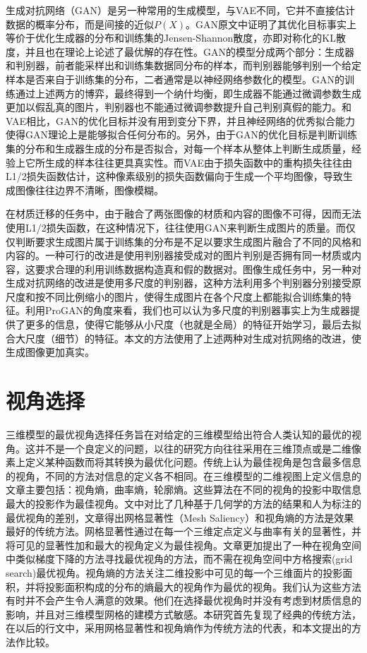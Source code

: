 \documentclass[UTF8,openany,AutoFakeBold,AutoFakeSlant,cs4size]{ctexbook}
\begin{document}
生成对抗网络（GAN）\cite{NIPS2014_5423}是另一种常用的生成模型，与VAE不同，它并不直接估计数据的概率分布，而是间接的近似$P(X)$。GAN原文中证明了其优化目标事实上等价于优化生成器的分布和训练集的Jensen-Shannon散度，亦即对称化的KL散度，并且也在理论上论述了最优解的存在性。GAN的模型分成两个部分：生成器和判别器，前者能采样出和训练集数据同分布的样本，而判别器能够判别一个给定样本是否来自于训练集的分布，二者通常是以神经网络参数化的模型。GAN的训练通过上述两方的博弈，最终得到一个纳什均衡，即生成器不能通过微调参数生成更加以假乱真的图片，判别器也不能通过微调参数提升自己判别真假的能力。和VAE相比，GAN的优化目标并没有用到变分下界，并且神经网络的优秀拟合能力使得GAN理论上是能够拟合任何分布的。另外，由于GAN的优化目标是判断训练集的分布和生成器生成的分布是否拟合，对每一个样本从整体上判断生成质量，经验上它所生成的样本往往更具真实性。而VAE由于损失函数中的重构损失往往由L1/2损失函数估计，这种像素级别的损失函数偏向于生成一个平均图像，导致生成图像往往边界不清晰，图像模糊。

在材质迁移的任务中，由于融合了两张图像的材质和内容的图像不可得，因而无法使用L1/2损失函数，在这种情况下，往往使用GAN来判断生成图片的质量。而仅仅判断要求生成图片属于训练集的分布是不足以要求生成图片融合了不同的风格和内容的。一种可行的改进是使用判别器接受成对的图片判别是否拥有同一材质或内容\cite{ma2017pose}，这要求合理的利用训练数据构造真和假的数据对。图像生成任务中，另一种对生成对抗网络的改进是使用多尺度的判别器，这种方法利用多个判别器分别接受原尺度和按不同比例缩小的图片，使得生成图片在各个尺度上都能拟合训练集的特征。利用ProGAN\cite{Karras2017ProgressiveGO}的角度来看，我们也可以认为多尺度的判别器事实上为生成器提供了更多的信息，使得它能够从小尺度（也就是全局）的特征开始学习，最后去拟合大尺度（细节）的特征。本文的方法使用了上述两种对生成对抗网络的改进，使生成图像更加真实。


\section{视角选择}

三维模型的最优视角选择任务旨在对给定的三维模型给出符合人类认知的最优的视角。这并不是一个良定义的问题，以往的研究方向往往采用在三维顶点或是二维像素上定义某种函数而将其转换为最优化问题。传统上认为最佳视角是包含最多信息的视角，不同的方法对信息的定义各不相同。在三维模型的二维视图上定义信息的文章主要包括：视角熵\cite{Vzquez2003AutomaticVS}，曲率熵\cite{Page2003ShapeAA}，轮廓熵\cite{Page2003ShapeAA}。这些算法在不同的视角的投影中取信息最大的投影作为最佳视角。\cite{Dutagaci2010ABF}文中对比了几种基于几何学的方法的结果和人为标注的最优视角的差别，文章得出网格显著性（Mesh Saliency）\cite{Lee2005MeshS}和视角熵\cite{Vzquez2003AutomaticVS}的方法是效果最好的传统方法。网格显著性\cite{Lee2005MeshS}通过在每一个三维定点定义与曲率有关的显著性，并将可见的显著性加和最大的视角定义为最佳视角。文章更加提出了一种在视角空间中类似梯度下降的方法寻找最优视角的方法，而不需在视角空间中方格搜索(grid search)最优视角。视角熵\cite{Vzquez2003AutomaticVS}的方法关注二维投影中可见的每一个三维面片的投影面积，并将投影面积构成的分布的熵最大的视角作为最优的视角。我们认为这些方法有时并不会产生令人满意的效果。他们在选择最优视角时并没有考虑到材质信息的影响，并且对三维模型网格的建模方式敏感。本研究首先复现了经典的传统方法，在以后的行文中，采用网格显著性和视角熵作为传统方法的代表，和本文提出的方法作比较。
\end{document}
